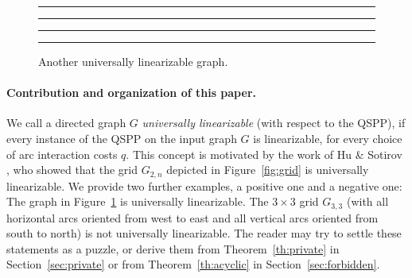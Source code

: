 \documentclass[11pt,fleqn]{article}
\begin{document}
\begin{figure}[bth]
\hrule\hrule
\medskip
\begin{center}
\end{center}
\vspace{-4ex}
\caption{Another universally linearizable graph.}
\label{fig:example2}
\bigskip
\hrule\hrule
\end{figure}

\paragraph{Contribution and organization of this paper.}
We call a directed graph $G$ \emph{universally linearizable} (with respect to the QSPP), 
if every instance of the QSPP on the input graph $G$ is linearizable, for every choice 
of arc interaction costs $q$.
This concept is motivated by the work of Hu \& Sotirov \cite{HuSo2018a}, who showed that 
the grid $G_{2,n}$ depicted in Figure~\ref{fig:grid} is universally linearizable.
We provide two further examples, a positive one and a negative one: 
The graph in Figure~\ref{fig:example2} is universally linearizable.
The $3\times3$ grid $G_{3,3}$ (with all horizontal arcs oriented from west to east and 
all vertical arcs oriented from south to north) is not universally linearizable.
The reader may try to settle these statements as a puzzle, or derive them from Theorem~\ref{th:private}
in Section~\ref{sec:private} or from Theorem~\ref{th:acyclic} in Section~\ref{sec:forbidden}.
\end{document}
